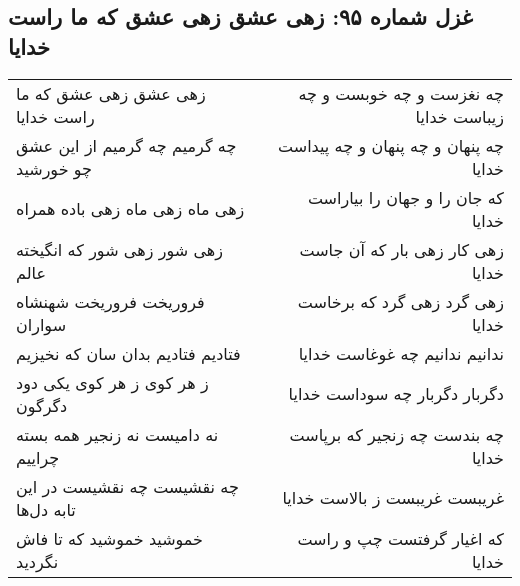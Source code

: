 \begin{center}
\section*{غزل شماره ۹۵: زهی عشق زهی عشق که ما راست خدایا}
\label{sec:0095}
\begin{longtable}{l p{0.5cm} r}
زهی عشق زهی عشق که ما راست خدایا
&&
چه نغزست و چه خوبست و چه زیباست خدایا
\\
چه گرمیم چه گرمیم از این عشق چو خورشید
&&
چه پنهان و چه پنهان و چه پیداست خدایا
\\
زهی ماه زهی ماه زهی باده همراه
&&
که جان را و جهان را بیاراست خدایا
\\
زهی شور زهی شور که انگیخته عالم
&&
زهی کار زهی بار که آن جاست خدایا
\\
فروریخت فروریخت شهنشاه سواران
&&
زهی گرد زهی گرد که برخاست خدایا
\\
فتادیم فتادیم بدان سان که نخیزیم
&&
ندانیم ندانیم چه غوغاست خدایا
\\
ز هر کوی ز هر کوی یکی دود دگرگون
&&
دگربار دگربار چه سوداست خدایا
\\
نه دامیست نه زنجیر همه بسته چراییم
&&
چه بندست چه زنجیر که برپاست خدایا
\\
چه نقشیست چه نقشیست در این تابه دل‌ها
&&
غریبست غریبست ز بالاست خدایا
\\
خموشید خموشید که تا فاش نگردید
&&
که اغیار گرفتست چپ و راست خدایا
\\
\end{longtable}
\end{center}

